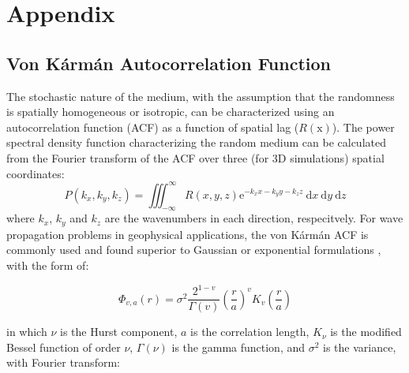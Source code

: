 
\appendix
\linespread{1.7}
\chapter*{Appendix}
\linespread{2.0}
\renewcommand{\thesection}{A}
\renewcommand{\thesubsection}{A\arabic{subsection}}
\renewcommand{\thefigure}{A\arabic{figure}}
\renewcommand{\theequation}{A\arabic{equation}}
\renewcommand{\thetable}{A\arabic{table}}


\linespread{1.7}
\section{Von K\'arm\'an Autocorrelation Function}
\linespread{2.0}
\label{app:A}

The stochastic nature of the medium, with the assumption that the randomness is spatially homogeneous or isotropic, can be characterized using an autocorrelation function (ACF) as a function of spatial lag ($R(\mathrm{x})$). The power spectral density function characterizing the random medium can be calculated from the Fourier transform of the ACF over three (for 3D simulations) spatial coordinates:
\begin{equation}
    P\left(k_{x}, k_{y}, k_{z}\right)=\iiint_{-\infty}^{\infty} R(x, y, z) \mathrm{e}^{-k_{x} x-k_{y} y-k_{z} z} \mathrm{~d} x \mathrm{~d} y \mathrm{~d} z
\end{equation}
\noindent where $k_x$, $k_y$ and $k_z$ are the wavenumbers in each direction, respecitvely. For wave propagation problems in geophysical applications, the von K\'arm\'an ACF is commonly used and found superior to Gaussian or exponential formulations \citep{frankelFiniteDifferenceSimulations1986}, with the form of:

\begin{equation}\label{eq:app-A1}
    \Phi_{v, a}(r)=\sigma^{2} \frac{2^{1-v}}{\Gamma(v)}\left(\frac{r}{a}\right)^{v} K_{v}\left(\frac{r}{a}\right)
\end{equation}

\noindent in which $\nu$ is the Hurst component, $a$ is the correlation length, $K_{\nu}$ is the modified Bessel function of order $\nu$, $\Gamma(\nu)$ is the gamma function, and $\sigma^2$ is the variance, with Fourier transform:


